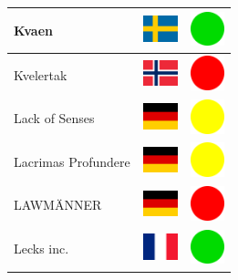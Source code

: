\documentclass[12pt, a4paper, twoside]{report}
\begin{document}
\begin{center}
\begin{longtable}{|p{5cm}|p{2cm}|p{2cm}|}
 Kvaen                                                      & \includegraphics[width=1cm]{../4x3/se} &   \includegraphics[width=1cm]{../likes/y} \\ \hline
 Kvelertak                                                  & \includegraphics[width=1cm]{../4x3/no} &   \includegraphics[width=1cm]{../likes/n} \\ \hline
 Lack of Senses                                             & \includegraphics[width=1cm]{../4x3/de} &   \includegraphics[width=1cm]{../likes/m} \\ \hline
 Lacrimas Profundere                                        & \includegraphics[width=1cm]{../4x3/de} &   \includegraphics[width=1cm]{../likes/m} \\ \hline
 LAWMÄNNER                                                  & \includegraphics[width=1cm]{../4x3/de} &   \includegraphics[width=1cm]{../likes/n} \\ \hline
 Lecks inc.                                                 & \includegraphics[width=1cm]{../4x3/fr} &   \includegraphics[width=1cm]{../likes/y} \\ \hline

\end{longtable}
\end{center}
\end{document}
